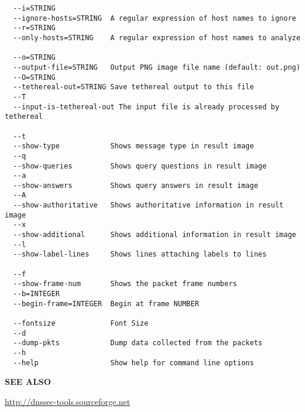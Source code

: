 \begin{verbatim}
  --i=STRING
  --ignore-hosts=STRING  A regular expression of host names to ignore
  --r=STRING
  --only-hosts=STRING    A regular expression of host names to analyze

  --o=STRING
  --output-file=STRING   Output PNG image file name (default: out.png)
  --O=STRING
  --tethereal-out=STRING Save tethereal output to this file
  --T
  --input-is-tethereal-out The input file is already processed by tethereal

  --t
  --show-type            Shows message type in result image
  --q
  --show-queries         Shows query questions in result image
  --a
  --show-answers         Shows query answers in result image
  --A
  --show-authoritative   Shows authoritative information in result image
  --x
  --show-additional      Shows additional information in result image
  --l
  --show-label-lines     Shows lines attaching labels to lines

  --f
  --show-frame-num       Shows the packet frame numbers
  --b=INTEGER
  --begin-frame=INTEGER  Begin at frame NUMBER

  --fontsize             Font Size
  --d
  --dump-pkts            Dump data collected from the packets
  --h
  --help                 Show help for command line options
\end{verbatim}

{\bf SEE ALSO}


\url{http://dnssec-tools.sourceforge.net}

